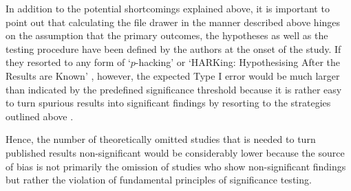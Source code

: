 In addition to the potential shortcomings explained above, it is important to point out that calculating the file drawer in the manner described above hinges on the assumption that the primary outcomes, the hypotheses as well as the testing procedure have been defined by the authors at the onset of the study. If they resorted to any form of `$p$-hacking' \citep{head_extent_2015} or `HARKing: Hypothesising After the Results are Known' \citep{kerr_harking_1998}, however, the expected Type I error would be much larger than indicated by the predefined significance threshold because it is rather easy to turn spurious results into significant findings by resorting to the strategies outlined above \citep{simmons_falsepositive_2011}.\par
Hence, the number of theoretically omitted studies that is needed to turn published results non-significant would be considerably lower because the source of bias is not primarily the omission of studies who show non-significant findings but rather the violation of fundamental principles of significance testing. 

